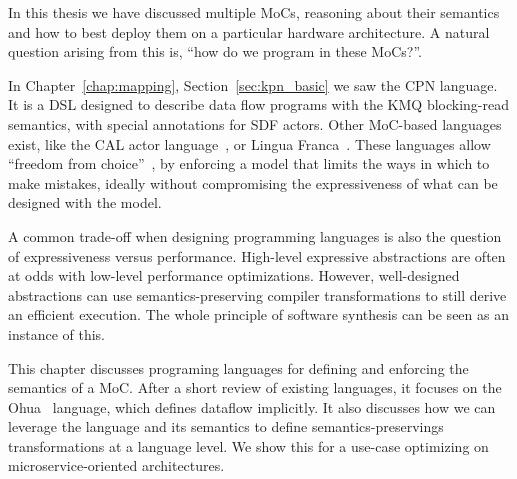 In this thesis we have discussed multiple \acfp{MoC}, reasoning about their semantics and how to best deploy them on a particular hardware architecture.
A natural question arising from this is, ``how do we program in these \acp{MoC}?''.

In Chapter~\ref{chap:mapping}, Section~\ref{sec:kpn_basic} we saw the \acf{CPN} language.
It is a \ac{DSL} designed to describe data flow programs with the \ac{KMQ} blocking-read semantics, with special annotations for \ac{SDF} actors.
Other \ac{MoC}-based languages exist, like the CAL actor language~\cite{eker2003cal}, or Lingua Franca~\cite{lohstroh2020language}.
These languages allow ``freedom from choice''~\cite{lee2019freedom}, by enforcing a model that limits the ways in which to make mistakes, ideally without compromising the expressiveness of what can be designed with the model.

A common trade-off when designing programming languages is also the question of expressiveness versus performance.
High-level expressive abstractions are often at odds with low-level performance optimizations.
However, well-designed abstractions can use semantics-preserving compiler transformations to still derive an efficient execution.
The whole principle of software synthesis can be seen as an instance of this.

This chapter discusses programing languages for defining and enforcing the semantics of a \ac{MoC}.
After a short review of existing languages, it focuses on the Ohua~\cite{ertel_phdthesis} language, which defines dataflow implicitly.
It also discusses how we can leverage the language and its semantics to define semantics-preservings transformations at a language level.
We show this for a use-case optimizing  on microservice-oriented architectures.